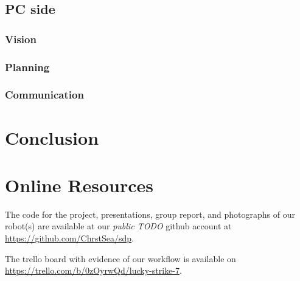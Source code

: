 \documentclass[12pt,a4paper]{article}
\begin{document}
\subsection{PC side}
\subsubsection{Vision}
\subsubsection{Planning}
\subsubsection{Communication}

\section{Conclusion}

\section{Online Resources}
The code for the project, presentations, group report, and photographs of our robot(s) are available at our \textit{public TODO} github account at \url{https://github.com/ChrstSea/sdp}.

The trello board with evidence of our workflow is available on \url{https://trello.com/b/0zOyrwQd/lucky-strike-7}.
\end{document}
